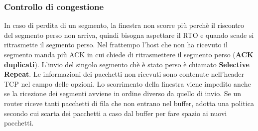 \documentclass[a4paper]{article}
\begin{document}
\subsubsection{Controllo di congestione}
In caso di perdita di un segmento, la finestra non scorre più perchè il riscontro del
segmento perso non arriva, quindi bisogna aspettare il RTO e quando scade si ritrasmette
il segmento perso. Nel frattempo l'host che non ha ricevuto il segmento manda più ACK
in cui chiede di ritrasmettere il segmento perso (\textbf{ACK duplicati}). L'invio del singolo segmento chè
è stato perso è chiamato \textbf{Selective Repeat}. Le informazioni dei pacchetti non
ricevuti sono contenute nell'header TCP nel campo delle opzioni.
\label{06-11-D1}
Lo scorrimento della finestra viene impedito anche se la ricezione dei segmenti avviene
in ordine diverso da quello di invio.
\label{06-11-D2}
Se un router riceve tanti pacchetti di fila che non entrano nel buffer, adotta una
politica secondo cui scarta dei pacchetti a caso dal buffer per fare spazio ai nuovi 
pacchetti.
\end{document}
